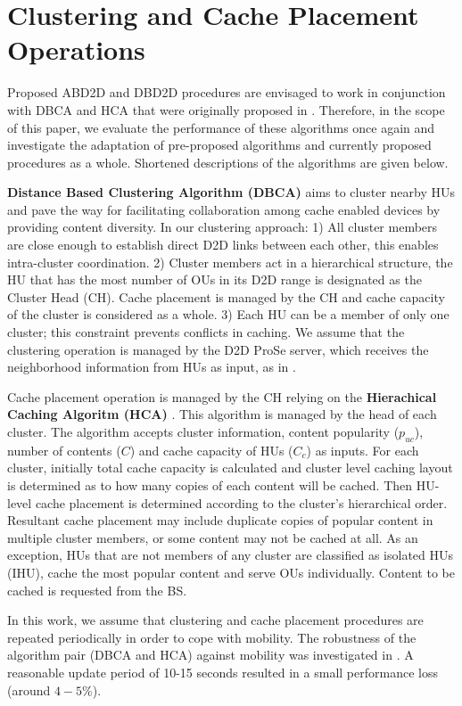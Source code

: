 \documentclass[10pt,a4paper,twocolumn]{article}
\begin{document}
\section{Clustering and Cache Placement Operations}
\label{sec:sec4}
Proposed ABD2D and DBD2D procedures are envisaged to work in conjunction with DBCA and HCA that were originally proposed in \cite{Kazez2019Clustering}. Therefore, in the scope of this paper, we evaluate the performance of these algorithms once again and investigate the adaptation of pre-proposed algorithms and currently proposed procedures as a whole. Shortened descriptions of the algorithms are given below.

\textbf{Distance Based Clustering Algorithm (DBCA)} aims to cluster nearby HUs and pave the way for facilitating collaboration among cache enabled devices by providing content diversity. In our clustering approach: 1) All cluster members are close enough to establish direct D2D links between each other, this enables intra-cluster coordination. 2) Cluster members act in a hierarchical structure, the HU that has the most number of OUs in its D2D range is designated as the Cluster Head (CH). Cache placement is managed by the CH and cache capacity of the cluster is considered as a whole. 3) Each HU can be a member of only one cluster; this constraint prevents conflicts in caching. We assume that the clustering operation is managed by the D2D ProSe server, which receives the neighborhood information from HUs as input, as in \cite{doumiati2017framework}.

Cache placement operation is managed by the CH relying on the \textbf{Hierachical Caching Algoritm (HCA)} \cite{Kazez2019Clustering}. This algorithm is managed by the head of each cluster. The algorithm accepts cluster information, content popularity ($p_{uc}$), number of contents ($C$) and cache capacity of HUs ($C_c$) as inputs. For each cluster, initially total cache capacity is calculated and cluster level caching layout is determined as to how many copies of each content will be cached. Then HU-level cache placement is determined according to the cluster's hierarchical order. Resultant cache placement may include duplicate copies of popular content in multiple cluster members, or some content may not be cached at all. As an exception, HUs that are not members of any cluster are classified as isolated HUs (IHU), cache the most popular content and serve OUs individually. Content to be cached is requested from the BS.

In this work, we assume that clustering and cache placement procedures are repeated periodically in order to cope with mobility. The robustness of the algorithm pair (DBCA and HCA) against mobility was investigated in \cite{KazezMobility2019}. A reasonable update period of 10-15 seconds resulted in a small performance loss (around $ 4-5\%$). 
\end{document}
